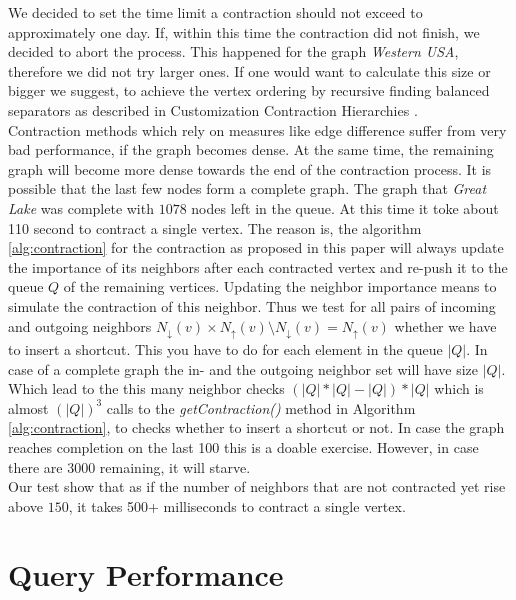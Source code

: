 We decided to set the time limit a contraction should not exceed to approximately one day.
If, within this time the contraction did not finish, we decided to abort the process.
This happened for the graph \textit{Western USA}, therefore we did not try larger ones.
If one would want to calculate this size or bigger we suggest, to achieve the vertex ordering by recursive finding balanced separators as described in Customization Contraction Hierarchies \cite{CCH}.
\\
Contraction methods which rely on measures like edge difference suffer from very bad performance, if the graph becomes dense.
At the same time, the remaining graph will become more dense towards the end of the contraction process.
It is possible  that the last few nodes form a complete graph.
The graph that \textit{Great Lake} was complete with $1078$ nodes left in the queue.
At this time it toke about 110 second to contract a single vertex.
The reason is, the algorithm \ref{alg:contraction} for the contraction as proposed in this paper will always update the importance of its neighbors after each contracted vertex and re-push it to the queue $Q$ of the remaining vertices.
Updating the neighbor importance means to simulate the contraction of this neighbor.
Thus we test for all pairs of incoming and outgoing neighbors $N_\downarrow(v) \times N_\uparrow(v) \setminus N_\downarrow(v) = N_\uparrow(v)$ whether we have to insert a shortcut.
This you have to do for each element in the queue $|Q|$.
In case of a complete graph the in- and the outgoing neighbor set will have size $|Q|$.
Which lead to the this many neighbor checks $(|Q| * |Q| - |Q|)*|Q|$ which is almost $(|Q|)^3$ calls to the \textit{getContraction()} method in Algorithm \ref{alg:contraction}, to checks whether to insert a shortcut or not.
In case the graph reaches completion on the last 100 this is a doable exercise.
However, in case there are 3000 remaining, it will starve.
\\
Our test show that as if the number of neighbors that are not contracted yet rise above $150$, it takes 500+ milliseconds to contract a single vertex.

\section{Query Performance}

